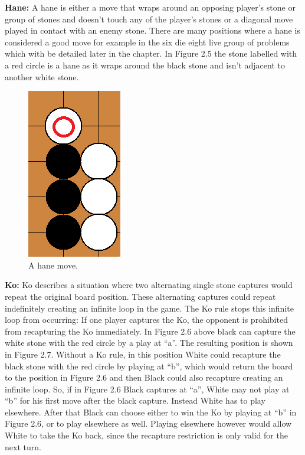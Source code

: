 \documentclass{l3proj}
\begin{document}
\textbf{Hane:} A hane is either a move that wraps around an opposing player's stone or group of stones and doesn’t touch any of the player’s stones or a diagonal move played in contact with an enemy stone. There are many positions where a hane is considered a good move for example in the six die eight live group of problems which with be detailed later in the chapter. In Figure 2.5 the stone labelled with a red circle is a hane as it wraps around the black stone and isn’t adjacent to another white stone.

\begin{figure}[H]
\centering
\includegraphics[scale=0.5]{Images/ahane.png}
\caption{A hane move.}
\end{figure}

\textbf{Ko:} Ko describes a situation where two alternating single stone captures would repeat the original board position. These alternating captures could repeat indefinitely creating an infinite loop in the game. The Ko rule stops this infinite loop from occurring: If one player captures the Ko, the opponent is prohibited from recapturing the Ko immediately. In Figure 2.6 above black can capture the white stone with the red circle by a play at “a”. The resulting position is shown in Figure 2.7. Without a Ko rule, in this position White could recapture the black stone with the red circle by playing at “b”, which would return the board to the position in Figure 2.6 and then Black could also recapture creating an infinite loop. So, if in Figure 2.6 Black captures at “a”, White may not play at “b” for his first move after the black capture. Instead White has to play elsewhere. After that Black can choose either to win the Ko by playing at “b” in Figure 2.6, or to play elsewhere as well. Playing elsewhere however would allow White to take the Ko back, since the recapture restriction is only valid for the next turn.
\end{document}
